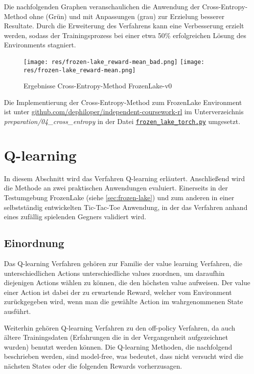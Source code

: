 \documentclass[11pt]{scrartcl}
\begin{document}
Die nachfolgenden Graphen veranschaulichen die Anwendung der Cross-Entropy-Method ohne (Grün)
und mit Anpassungen (grau) zur Erzielung besserer Resultate. Durch die Erweiterung des
Verfahrens kann eine Verbesserung erzielt werden, sodass der Trainingsprozess bei einer
etwa 50\% erfolgreichen Lösung des Environments stagniert.

\begin{figure}[htp]
\centering
\texttt{[image: res/frozen-lake\_reward-mean\_bad.png]}
\texttt{[image: res/frozen-lake\_reward-mean.png]}
\caption{Ergebnisse Cross-Entropy-Method FrozenLake-v0}
\label{fig:frozen-lake_cross-entropy}
\end{figure}

Die Implementierung der Cross-Entropy-Method zum FrozenLake Environment ist unter
\url{github.com/dephiloper/independent-coursework-rl} im Unterverzeichnis 
\textit{preparation/04\_cross\_entropy} in der Datei 
\href{https://github.com/dephiloper/independent-coursework-rl/blob/master/preparation/04_cross_entropy/frozen_lake_torch.py}{\nolinkurl{frozen\_lake\_torch.py}} umgesetzt.
\newpage


\section{Q-learning}
In diesem Abschnitt wird das Verfahren Q-learning erläutert. Anschließend wird die Methode
an zwei praktischen Anwendungen evaluiert. Einerseits in der Testumgebung FrozenLake
(siehe \autoref{sec:frozen-lake}) und zum anderen in einer selbstständig entwickelten
Tic-Tac-Toe Anwendung, in der das Verfahren anhand eines zufällig spielenden Gegners
validiert wird.


\subsection{Einordnung}
Das Q-learning Verfahren gehören zur Familie der value learning Verfahren, die
unterschiedlichen Actions unterschiedliche values zuordnen, um daraufhin diejenigen Actions
wählen zu können, die den höchsten value aufweisen. Der value einer Action ist dabei der
zu erwartende Reward, welcher vom Environment zurückgegeben wird, wenn man die gewählte
Action im wahrgenommenen State ausführt.

Weiterhin gehören Q-learning Verfahren zu den off-policy Verfahren, da auch ältere
Trainingsdaten (Erfahrungen die in der Vergangenheit aufgezeichnet wurden) benutzt
werden können. Die Q-learning Methoden, die nachfolgend beschrieben werden, sind
model-free, was bedeutet, dass nicht versucht wird die nächsten States oder die
folgenden Rewards vorherzusagen.
\end{document}

